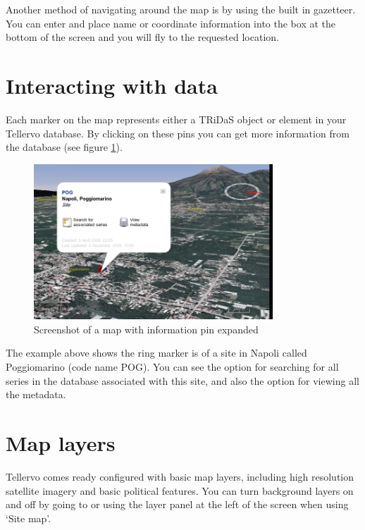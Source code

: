 
Another method of navigating around the map is by using the built in gazetteer. You can enter and place name or coordinate information into the box at the bottom of the screen and you will fly to the requested location. 


\section{Interacting with data}

Each marker on the map represents either a TRiDaS object or element in your Tellervo database. By clicking on these pins you can get more information from the database (see figure \ref{fig:mappin}).

\begin{figure}[hbtp]
  \centering
  \includegraphics[width=0.8\textwidth]{Images/mappinexample.png}
  \caption{Screenshot of a map with information pin expanded}
  \label{fig:mappin}
\end{figure}

The example above shows the ring marker is of a site in Napoli called Poggiomarino (code name POG). You can see the option for searching for all series in the database associated with this site, and also the option for viewing all the metadata. 

\section{Map layers}
\label{txt:userAddWMS}

Tellervo comes ready configured with basic map layers, including high resolution satellite imagery and basic political features. You can turn background layers on and off by going to  or using the layer panel at the left of the screen when using `Site map'.

